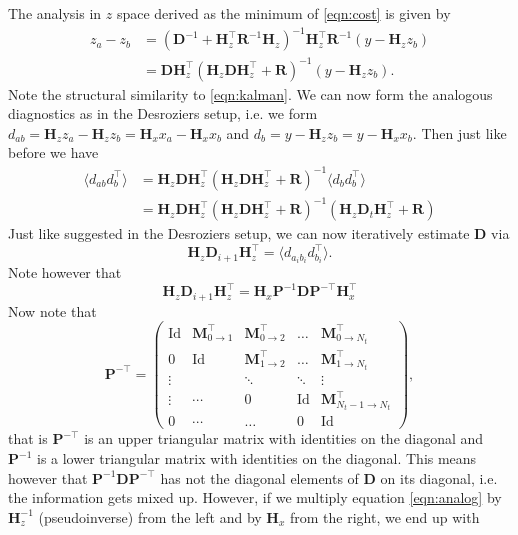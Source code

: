 \documentclass[a4paper,10pt]{article}
\numberwithin{equation}{section}
\begin{document}
The analysis in $z$ space derived as the minimum of \eqref{eqn:cost} is given by 
\begin{align}
\label{eqn:some}
z_a-z_b &= \left(\mathbf D^{-1} + \mathbf H_z^\top \mathbf R^{-1} \mathbf H_z \right)^{-1} \mathbf H_z^\top \mathbf R^{-1} \left(y - \mathbf H_z z_b\right) \\
&=\mathbf D \mathbf H_z^\top(\mathbf H_z \mathbf D \mathbf H_z^\top+\mathbf R)^{-1}(y-\mathbf H_zz_b).
\end{align}
Note the structural similarity to \eqref{eqn:kalman}. We can now form the analogous diagnostics as in the Desroziers setup, i.e. we form 
$d_{ab}=\mathbf H_zz_a-\mathbf H_zz_b=\mathbf H_x x_a-\mathbf H_xx_b$ and $d_b=y-\mathbf H_z z_b=y-\mathbf H_x x_b$. Then just like before we have 
\begin{align*}
\langle d_{ab} d_b^\top\rangle &= \mathbf H_z\mathbf D\mathbf H_z^\top(\mathbf H_z \mathbf D \mathbf H_z^\top +\mathbf R)^{-1}\langle d_b d_b^\top \rangle \\&= \mathbf H_z \mathbf D\mathbf H_z^\top(\mathbf H_z \mathbf D \mathbf H_z^\top +\mathbf R)^{-1}(\mathbf H_z \mathbf D_t \mathbf H_z^\top +\mathbf R)
\end{align*}
Just like suggested in the Desroziers setup, we can now iteratively estimate $\mathbf D$ via 
\begin{equation}
\label{eqn:analog}
\mathbf H_z \mathbf D_{i+1} \mathbf H_z^\top= \langle d_{a_ib_i}d_{b_i}^\top \rangle.
\end{equation}
Note however that 
\begin{equation*}
\mathbf H_z \mathbf D_{i+1} \mathbf H_z^\top=\mathbf H_x \mathbf P^{-1} \mathbf D \mathbf P^{-\top}\mathbf H_x^\top
\end{equation*}
Now note that 
\begin{equation}
\mathbf P^{-\top } = 
\begin{pmatrix}
\text{Id}& \mathbf M_{0\to 1}^\top  & \mathbf M_{0\to 2}^\top & \hdots&\mathbf M_{0\to N_t}^\top \\
0 & \text{Id} & \mathbf M_{1\to 2}^\top  &\hdots& \mathbf M_{1\to N_t}^\top \\
\vdots &  & \ddots & \ddots&\vdots\\
\vdots& \cdots & 0&\text{Id}&\mathbf M_{N_t-1\to N_t}^\top\\
0 & \cdots &\hdots& 0 & \text{Id} 
\end{pmatrix},
\end{equation}
that is $\mathbf P^{-\top}$ is an upper triangular matrix with identities on the diagonal and $\mathbf P^{-1}$ is a lower triangular matrix with identities on the diagonal. This means however that $\mathbf P^{-1}\mathbf D\mathbf P^{-\top}$ has not the diagonal elements of $\mathbf D$ on its diagonal, i.e. the information gets mixed up. However, if we multiply equation \eqref{eqn:analog} by $\mathbf H_z^{-1}$ (pseudoinverse) from the left and by $\mathbf H_x$ from the right, we end up with 
\end{document}
